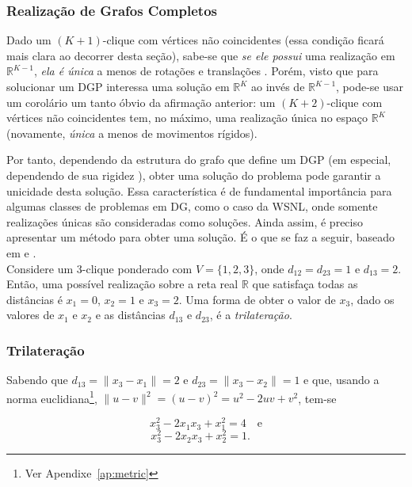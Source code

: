 \subsubsection{Realização de Grafos Completos}

 Dado um $(K+1)$-clique com vértices não coincidentes (essa condição ficará mais clara ao decorrer desta seção), sabe-se que \textit{se ele possui} uma realização em $\mathbb{R}^{K-1}$, \textit{ela é única} a menos de rotações e translações \cite{libertiEDG, hendrickson1992conditions, connelly1991generic}. Porém, visto que para solucionar um DGP interessa uma solução em $\mathbb{R}^K$ ao invés de $\mathbb{R}^{K-1}$, pode-se usar um corolário um tanto óbvio da afirmação anterior: um $(K+2)$-clique com vértices não coincidentes tem, no máximo, uma realização única no espaço $\mathbb{R}^K$ (novamente, \textit{única} a menos de movimentos rígidos). 

Por tanto, dependendo da estrutura do grafo que define um DGP (em especial, dependendo de sua rigidez \cite{eren2004rigidity, alfakihEuclideanDistanceMatricesApplicationsRigidity}), obter uma solução do problema pode garantir a unicidade desta solução. Essa característica é de fundamental importância para algumas classes de problemas em DG, como o caso da WSNL, onde somente realizações únicas são consideradas como soluções. Ainda assim, é preciso apresentar um método para obter uma solução.  É o que se faz a seguir, baseado em \cite{libertiEDG} e \cite{trilaterationDong}. 
\\

Considere um 3-clique ponderado com $V = \{1,2,3\}$, onde $d_{12} = d_{23} = 1$ e $d_{13} = 2$. Então, uma possível realização sobre a reta real $\mathbb{R}$ que satisfaça todas as distâncias é $x_1 = 0$, $x_2 = 1$ e $x_3 = 2$. Uma forma de obter o valor de $x_3$, dado os valores de $x_1$ e $x_2$ e as distâncias $d_{13}$ e $d_{23}$, é a \textit{trilateração}.

\subsubsection{Trilateração\label{sec:trilateration}}

 Sabendo que $d_{13} = \lVert x_3 - x_1\rVert = 2$ e $d_{23} = \lVert x_3 - x_2 \rVert = 1$ e que, usando a norma euclidiana\footnote{Ver Apendixe~\ref{ap:metric}}, $\lVert u-v\rVert^2 = (u-v)^2 = u^2 -2uv + v^2$, tem-se

\begin{equation}
	x_3^2 - 2x_1x_3 +x_1^2 = 4 \quad \textrm{e}
	\label{eq:trilateration1}
\end{equation}
\begin{equation}
x_3^2 - 2x_2x_3 +x_2^2 = 1. \quad
\label{eq:trilateration2}
\end{equation}

